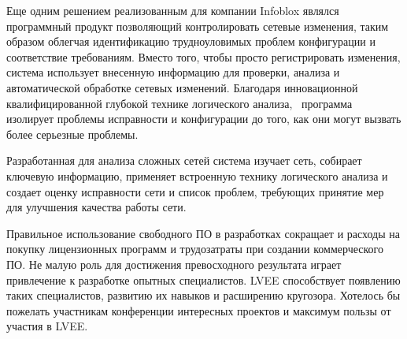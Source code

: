 \documentclass[10pt, a5paper]{article}
\begin{document}
Еще одним решением реализованным для компании Infoblox являлся программный продукт позволяющий контролировать сетевые изменения, таким образом облегчая идентификацию трудноуловимых проблем конфигурации и соответствие требованиям. Вместо того, чтобы просто регистрировать изменения, система использует внесенную информацию для проверки, анализа и автоматической обработке сетевых изменений. Благодаря инновационной квалифицированной глубокой технике логического анализа,  программа изолирует проблемы исправности и конфигурации до того, как они могут вызвать более серьезные проблемы. 

Разработанная для анализа сложных сетей система изучает сеть, собирает ключевую информацию, применяет встроенную технику логического анализа и создает оценку исправности сети и список проблем, требующих принятие мер для улучшения качества работы сети.  

Правильное использование свободного ПО в разработках сокращает и расходы на покупку лицензионных программ и трудозатраты при создании коммерческого ПО. Не малую роль для достижения превосходного результата играет привлечение к разработке опытных специалистов. LVEE способствует появлению таких специалистов, развитию их навыков и расширению кругозора. Хотелось бы пожелать участникам конференции интересных проектов и максимум пользы от участия в LVEE.
\end{document}
